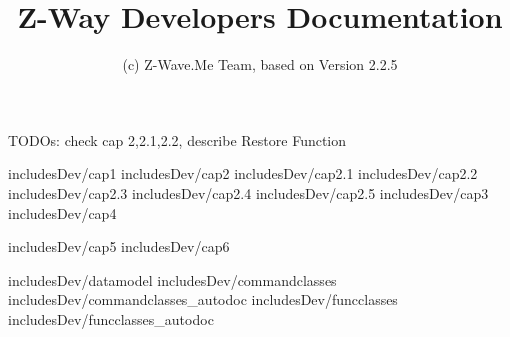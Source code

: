 \documentclass[10pt]{book}
\title{Z-Way Developers Documentation}
\author{(c) Z-Wave.Me Team, based on Version 2.2.5}
\date{}
\begin{document}
\maketitle
\tableofcontents


TODOs: check cap 2,2.1,2.2, describe Restore Function 

 {includesDev/cap1} 
 {includesDev/cap2} %
 {includesDev/cap2.1} %
 {includesDev/cap2.2} %
 {includesDev/cap2.3} %
 {includesDev/cap2.4} %
 {includesDev/cap2.5} %
 {includesDev/cap3} %
 {includesDev/cap4} %

 {includesDev/cap5} %
 {includesDev/cap6} %

 {includesDev/datamodel}
 {includesDev/commandclasses}
 {includesDev/commandclasses_autodoc}
 {includesDev/funcclasses}
 {includesDev/funcclasses_autodoc}
\end{document}

